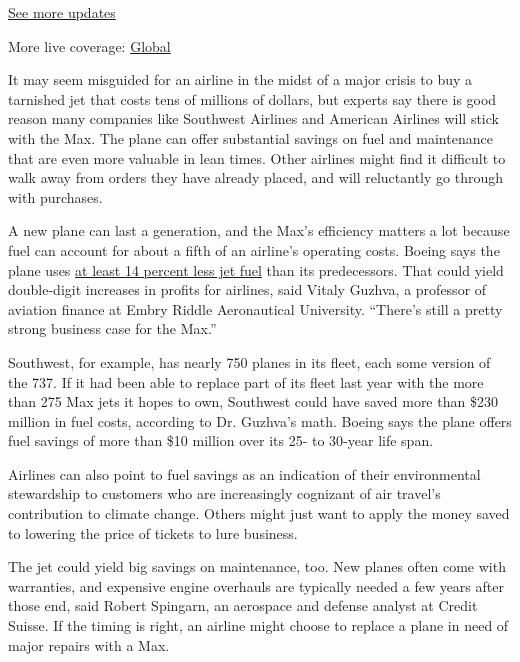 \href{https://www.nytimes3xbfgragh.onion/live/2020/08/03/business/stock-market-today-coronavirus?action=click\&pgtype=Article\&state=default\&region=MAIN_CONTENT_1\&context=storylines_live_updates}{See
more updates}

More live coverage:
\href{https://www.nytimes3xbfgragh.onion/2020/08/03/world/coronavirus-covid-19.html?action=click\&pgtype=Article\&state=default\&region=MAIN_CONTENT_1\&context=storylines_live_updates}{Global}

It may seem misguided for an airline in the midst of a major crisis to
buy a tarnished jet that costs tens of millions of dollars, but experts
say there is good reason many companies like Southwest Airlines and
American Airlines will stick with the Max. The plane can offer
substantial savings on fuel and maintenance that are even more valuable
in lean times. Other airlines might find it difficult to walk away from
orders they have already placed, and will reluctantly go through with
purchases.

A new plane can last a generation, and the Max's efficiency matters a
lot because fuel can account for about a fifth of an airline's operating
costs. Boeing says the plane uses
\href{https://www.boeing.com/commercial/737max/by-design/\#/improved-aerodynamics}{at
least 14 percent less jet fuel} than its predecessors. That could yield
double-digit increases in profits for airlines, said Vitaly Guzhva, a
professor of aviation finance at Embry Riddle Aeronautical University.
``There's still a pretty strong business case for the Max.''

Southwest, for example, has nearly 750 planes in its fleet, each some
version of the 737. If it had been able to replace part of its fleet
last year with the more than 275 Max jets it hopes to own, Southwest
could have saved more than \$230 million in fuel costs, according to Dr.
Guzhva's math. Boeing says the plane offers fuel savings of more than
\$10 million over its 25- to 30-year life span.

Airlines can also point to fuel savings as an indication of their
environmental stewardship to customers who are increasingly cognizant of
air travel's contribution to climate change. Others might just want to
apply the money saved to lowering the price of tickets to lure business.

The jet could yield big savings on maintenance, too. New planes often
come with warranties, and expensive engine overhauls are typically
needed a few years after those end, said Robert Spingarn, an aerospace
and defense analyst at Credit Suisse. If the timing is right, an airline
might choose to replace a plane in need of major repairs with a Max.

